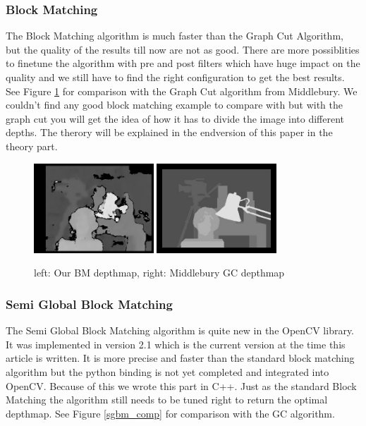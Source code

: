 \documentclass[a4paper]{article}
\begin{document}
\subsubsection{Block Matching}
The Block Matching algorithm is much faster than the Graph Cut
Algorithm, but the quality of the results till now are not as good.
There are more possiblities to finetune the algorithm with pre and
post filters which have huge impact on the quality and we still have
to find the right configuration to get the best results. See Figure
\ref{bm_comp} for comparison with the Graph Cut algorithm from
Middlebury. We couldn't find any good block matching example to
compare with but with the graph cut you will get the idea of how it
has to divide the image into different depths. The therory will be
explained in the endversion of this paper in the theory
part. %

\begin{figure} [h!tb]
  \centering
  \includegraphics[width=0.4\textwidth]{bm_tsukuba_own}
  \includegraphics[width=0.4\textwidth]{disp_tsukuba_orig}
  \caption{left: Our BM depthmap, right: Middlebury GC depthmap}
  \label{bm_comp}
\end{figure}

\subsubsection{Semi Global Block Matching}
The Semi Global Block Matching algorithm is quite new in the OpenCV
library. It was implemented in version 2.1 which is the current
version at the time this article is written. It is more precise and
faster than the standard block matching algorithm but the python
binding is not yet completed and integrated into OpenCV. Because of
this we wrote this part in C++. Just as the standard Block Matching
the algorithm still needs to be tuned right to return the optimal
depthmap. See Figure \ref{sgbm_comp} for comparison with the GC
algorithm.
\end{document}

